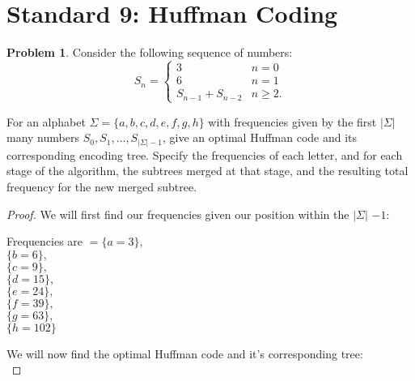 \documentclass[11pt]{article}
\theoremstyle{definition}
\theoremstyle{definition}
\newtheorem{required}{Problem}
\theoremstyle{definition}
\begin{document}
\section{Standard 9: Huffman Coding}
\begin{required}
Consider the following sequence of numbers:
\[
S_n = \begin{cases}
3 & n = 0 \\
6 & n = 1 \\
S_{n-1} + S_{n-2} & n \geq 2.
\end{cases}
\]

For an alphabet $\Sigma = \{a,b,c,d,e,f,g,h\}$ with frequencies given by the first $|\Sigma|$ many numbers $S_0, S_1, \dotsc, S_{|\Sigma|-1}$, give an optimal Huffman code and its corresponding encoding tree. Specify the frequencies of each letter, and for each stage of the algorithm, the subtrees merged at that stage, and the resulting total frequency for the new merged subtree.
\end{required}

\begin{proof} 
We will first find our frequencies given our position within the $|\Sigma|$ $-1$: \\
\begin{center}
Frequencies are $= \{a = 3\},$\\
$\{b = 6\},$ \\
$\{c = 9\},$ \\
$\{d = 15\},$ \\
$\{e = 24\},$ \\
$\{f = 39\},$ \\
$\{g = 63\},$ \\
$\{h = 102\}$ \\
\end{center}
We will now find the optimal Huffman code and it's corresponding tree: \\

\end{proof}



\end{document}
